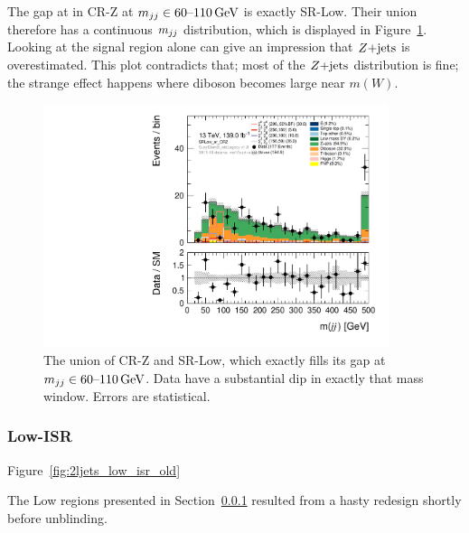The gap at in CR-Z at $\mjj \in 60\textrm{--}110\,\eV[G]$ is exactly SR-Low.
Their union therefore has a continuous $\mjj$ distribution, which is displayed
in Figure~\ref{fig:2ljets_low_sr_or_cr_region}.
Looking at the signal region alone can give an impression that $\zjets$ is
overestimated.
This plot contradicts that; most of the $\zjets$ distribution is fine;
the strange effect happens where diboson becomes large near $m(W)$.

\begin{figure}[tp]
\centering
\includegraphics[width=0.9\textwidth]{figures/2ljets_low_mjj_SRLow_or_CRZ.pdf}
\caption[
The union of CR-Z and SR-Low
]{%
The union of CR-Z and SR-Low, which exactly fills its gap at
$\mjj \in 60\textrm{--}110\,\eV[G]$.
Data have a substantial dip in exactly that mass window.
Errors are statistical.
}
\label{fig:2ljets_low_sr_or_cr_region}
\end{figure}

\subsubsection{Low-ISR}
\label{sec:2ljets_low_isr}
Figure~\ref{fig:2ljets_low_isr_old}

The Low regions presented in Section~\ref{sec:2ljets_low_isr} resulted from a
hasty redesign shortly before unblinding.

